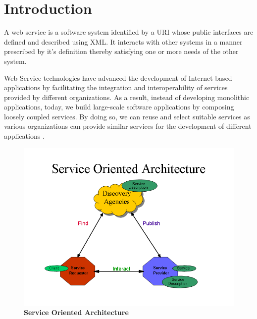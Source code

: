 \documentclass[12pt, twoside]{book}
\begin{document}
\thispagestyle{empty}
\listoffigures
\listoftables
\tableofcontents

\setcounter{page}{1}

\chapter{Introduction}
A web service is a software system identified by a URI whose public interfaces are defined and described using XML. It interacts with other systems in a manner prescribed by it's definition thereby satisfying one or more needs of the other system. \\ \par
Web Service technologies have advanced the development of Internet-based applications by facilitating the integration and interoperability of services provided by different organizations. As a result, instead of developing monolithic applications, today, we build large-scale software applications by composing loosely coupled services. By doing so, we can reuse and select suitable services as various organizations can provide similar services for the development of different applications \cite{context_aware}.
\begin{figure}[H]
	\centering
	\includegraphics[width=\textwidth]{pics/soa.png}
	\caption{\textbf{Service Oriented Architecture \cite{web_arch_website}}}
\end{figure}
\end{document}
